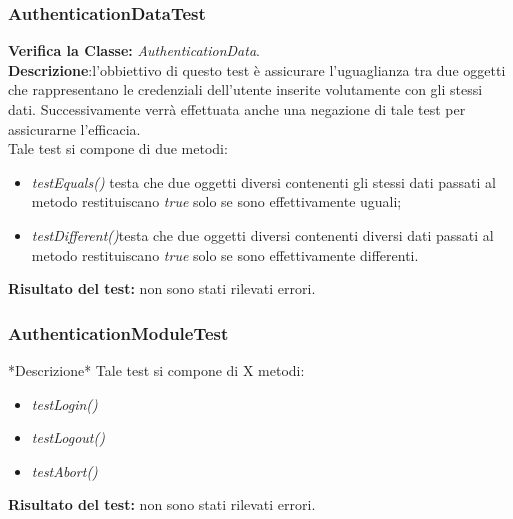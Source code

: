 \begin{table}
\end{table}

\subsubsection{AuthenticationDataTest}
\textbf{Verifica la Classe:} \textit{AuthenticationData}.\\
\textbf{Descrizione}:l'obbiettivo di questo test è assicurare l'uguaglianza tra due oggetti che rappresentano le credenziali dell'utente inserite volutamente con gli stessi dati. Successivamente verrà effettuata anche una negazione di tale test per assicurarne l'efficacia.\\
Tale test si compone di due metodi:
\begin{itemize}
\item \textit{testEquals() } testa che due oggetti diversi contenenti gli stessi dati passati al metodo restituiscano \textit{true} solo se sono effettivamente uguali;
\item \textit{testDifferent()}testa che due oggetti diversi contenenti diversi dati passati al metodo restituiscano \textit{true} solo se sono effettivamente differenti.
\end{itemize}
\textbf{Risultato del test:} non sono stati rilevati errori.

\begin{table}
\end{table}

\subsubsection{AuthenticationModuleTest}
*Descrizione*
Tale test si compone di X metodi:
\begin{itemize}
\item \textit{testLogin() }
\item \textit{testLogout() }
\item \textit{testAbort() }
\end{itemize}
\textbf{Risultato del test:} non sono stati rilevati errori.

\begin{table}
\end{table}

